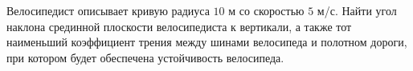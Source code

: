 Велосипедист описывает кривую радиуса $10$ м со скоростью $5$ м/с.
Найти угол наклона срединной плоскости велосипедиста к вертикали,
а также тот наименьший коэффициент трения между шинами велосипеда
и полотном дороги, при котором будет обеспечена устойчивость велосипеда.
